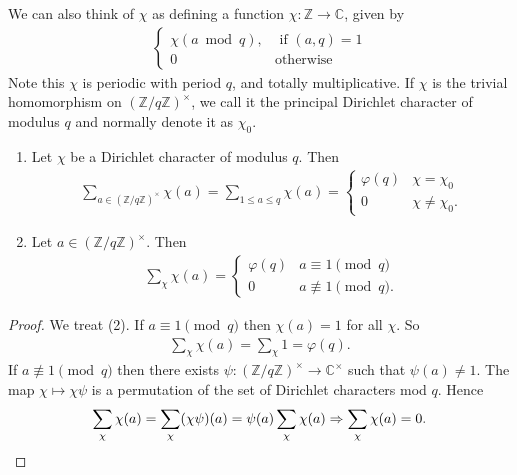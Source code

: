 \documentclass{article}
\newcommand{\1}{\mathbbm{1}}
\begin{document}
We can also think of $\chi$ as defining a function $\chi: \mathbb{Z}\to\mathbb{C}$, given by
\begin{align*}
  \begin{cases}
    \chi(a \bmod{q}), &\text{ if } (a,q) = 1 \\
    0 & \text{otherwise}
  \end{cases}
\end{align*}
Note this $\chi$ is periodic with period $q$, and totally multiplicative.
If $\chi$ is the trivial homomorphism on $(\mathbb{Z}/q\mathbb{Z})^\times$, we call it the principal Dirichlet character of modulus $q$ and normally denote it as $\chi_0$.

\begin{nlemma}\label{lem:4.1}\leavevmode
  \begin{enumerate}[(1)]
    \item Let $\chi$ be a Dirichlet character of modulus $q$. Then
      \begin{align*}
        \sum_{a \in (\mathbb{Z}/q\mathbb{Z})^\times} \chi(a) = \sum_{1 \leq a \leq q} \chi(a) =
        \begin{cases}
          \varphi(q) & \chi = \chi_0 \\
          0 & \chi \neq \chi_0.
        \end{cases}
      \end{align*}
    \item Let $a \in (\mathbb{Z}/q\mathbb{Z})^\times$. Then
      \begin{align*}
        \sum_\chi \chi(a) =
        \begin{cases}
          \varphi(q) &a \equiv 1 \pmod{q} \\
          0 & a \not\equiv 1 \pmod{q}.
        \end{cases}
      \end{align*}
  \end{enumerate}
\end{nlemma}
\begin{proof}
  We treat (2). If $a \equiv 1 \pmod{q}$ then $\chi(a)=1$ for all $\chi$. So
  \begin{align*}
    \sum_\chi \chi(a) = \sum_\chi 1 = \varphi(q).
  \end{align*}
  If $a \not\equiv 1 \pmod{q}$ then there exists $\psi:(\mathbb{Z}/q\mathbb{Z})^\times \to \mathbb{C}^\times$ such that $\psi(a)\neq 1$.
  The map $\chi \mapsto \chi \psi$ is a permutation of the set of Dirichlet characters mod $q$.
  Hence
  \begin{equation*}
    \sum_\chi \chi(a) = \sum_\chi (\chi \psi)(a) = \psi(a) \sum_\chi \chi(a) \Rightarrow \sum_\chi \chi(a) = 0. \qedhere
  \end{equation*}
\end{proof}
\end{document}
